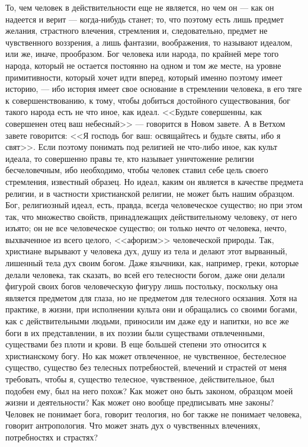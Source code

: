 \documentclass[12pt]{article}
\begin{document}
То, чем человек в действительности еще не является, но чем он --- как он надеется и верит --- когда-нибудь станет; то, что поэтому есть лишь предмет желания, страстного влечения, стремления и, следовательно, предмет не чувственного воззрения, а лишь фантазии, воображения, то называют идеалом, или же, иначе, прообразом. Бог человека или народа, по крайней мере того народа, который не остается постоянно на одном и том же месте, на уровне примитивности, который хочет идти вперед, который именно поэтому имеет историю, --- ибо история имеет свое основание в стремлении человека, в его тяге к совершенствованию, к тому, чтобы добиться достойного существования, бог такого народа есть не что иное, как идеал. <<Будьте совершенны, как совершенен отец ваш небесный>> --- говорится в Новом завете. А в Ветхом завете говорится: <<Я господь бог ваш: освящайтесь и будьте святы, ибо я свят>>. Если поэтому понимать под религией не что-либо иное, как культ идеала, то совершенно правы те, кто называет уничтожение религии бесчеловечным, ибо необходимо, чтобы человек ставил себе цель своего стремления, известный образец. Но идеал, каким он является в качестве предмета религии, и в частности христианской религии, не может быть нашим образцом. Бог, религиозный идеал, есть, правда, всегда человеческое существо; но при этом так, что множество свойств, принадлежащих действительному человеку, от него изъято; он не все человеческое существо; он только нечто от человека, нечто, выхваченное из всего целого, <<афоризм>> человеческой природы. Так, христиане вырывают у человека дух, душу из тела и делают этот вырванный, лишенный тела дух своим богом. Даже язычники, как, например, греки, которые делали человека, так сказать, во всей его телесности богом, даже они делали фигурой своих богов человеческую фигуру лишь постольку, поскольку она является предметом для глаза, но не предметом для телесного осязания. Хотя на практике, в жизни, при исполнении культа они и обращались со своими богами, как с действительными людьми, приносили им даже еду и напитки, но все же боги в их представлении, в их поэзии были существами отвлеченными, существами без плоти и крови. В еще большей степени это относится к христианскому богу. Но как может отвлеченное, не чувственное, бестелесное существо, существо без телесных потребностей, влечений и страстей от меня требовать, чтобы я, существо телесное, чувственное, действительное, был подобен ему, был на него похож? Как может оно быть законом, образцом моей жизни и деятельности? Как может оно вообще предписывать мне законы? Человек не понимает бога, говорит теология, но бог также не понимает человека, говорит антропология. Что может знать дух о чувственных влечениях, потребностях и страстях? 
\end{document}

